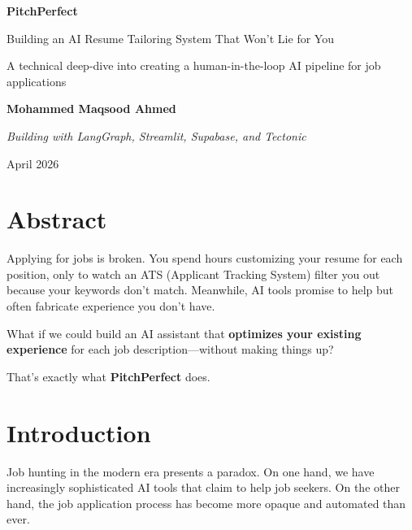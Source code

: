 \documentclass[12pt, a4paper]{article}
\begin{document}
\begin{center}
\thispagestyle{empty}
\vspace*{2cm}

{\Huge\bfseries PitchPerfect}

\vspace{0.5cm}

{\LARGE Building an AI Resume Tailoring System That Won't Lie for You}

\vspace{1cm}

{\large A technical deep-dive into creating a human-in-the-loop AI pipeline for job applications}

\vspace{2cm}

\textbf{Mohammed Maqsood Ahmed}

\vspace{0.5cm}

\textit{Building with LangGraph, Streamlit, Supabase, and Tectonic}

\vfill

April 2026

\end{center}

\newpage

\tableofcontents
\newpage

\section*{Abstract}

Applying for jobs is broken. You spend hours customizing your resume for each position, only to watch an ATS (Applicant Tracking System) filter you out because your keywords don't match. Meanwhile, AI tools promise to help but often fabricate experience you don't have.

What if we could build an AI assistant that \textbf{optimizes your existing experience} for each job description---without making things up?

That's exactly what \textbf{PitchPerfect} does.

\newpage

\section{Introduction}

Job hunting in the modern era presents a paradox. On one hand, we have increasingly sophisticated AI tools that claim to help job seekers. On the other hand, the job application process has become more opaque and automated than ever.
\end{document}
